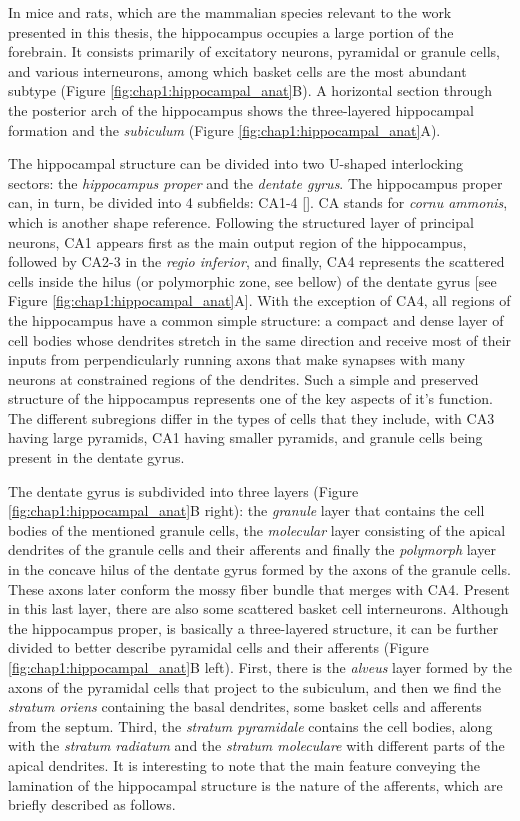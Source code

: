 In mice and rats, which are the mammalian species relevant to the work presented in this thesis, the hippocampus occupies a large portion of the forebrain. 
It consists primarily of excitatory neurons, pyramidal or granule cells, and various interneurons, among which basket cells are the most abundant subtype (Figure \ref{fig:chap1:hippocampal_anat}B). 
A horizontal section through the posterior arch of the hippocampus shows the three-layered hippocampal formation and the \textit{subiculum} (Figure \ref{fig:chap1:hippocampal_anat}A).

The hippocampal structure can be divided into two U-shaped interlocking sectors: the \textit{hippocampus proper} and the \textit{dentate gyrus}.
The hippocampus proper can, in turn, be divided into 4 subfields: CA1-4 [\cite{lorente1934}].
CA stands for \textit{cornu ammonis}, which is another shape reference. 
Following the structured layer of principal neurons, CA1 appears first as the main output region of the hippocampus, followed by CA2-3 in the \textit{regio inferior}, and finally, CA4 represents the scattered cells inside the hilus (or polymorphic zone, see bellow) of the dentate gyrus [see Figure \ref{fig:chap1:hippocampal_anat}A]. 
With the exception of CA4, all regions of the hippocampus have a common simple structure: a compact and dense layer of cell bodies whose dendrites stretch in the same direction and receive most of their inputs from perpendicularly running axons that make synapses with many neurons at constrained regions of the dendrites. 
Such a simple and preserved structure of the hippocampus represents one of the key aspects of it's function. 
The different subregions differ in the types of cells that they include, with CA3 having large pyramids, CA1 having smaller pyramids, and granule cells being present in the dentate gyrus. 

The dentate gyrus is subdivided into three layers (Figure \ref{fig:chap1:hippocampal_anat}B right): the \textit{granule} layer that contains the cell bodies of the mentioned granule cells, the \textit{molecular} layer consisting of the apical dendrites of the granule cells and their afferents and finally the \textit{polymorph} layer in the concave hilus of the dentate gyrus formed by the axons of the granule cells.
These axons later conform the mossy fiber bundle that merges with CA4. 
Present in this last layer, there are also some scattered basket cell interneurons.
Although the hippocampus proper, is basically a three-layered structure, it can be further divided to better describe pyramidal cells and their afferents (Figure \ref{fig:chap1:hippocampal_anat}B left).
First, there is the \textit{alveus} layer formed by the axons of the pyramidal cells that project to the subiculum, and then we find the \textit{stratum oriens} containing the basal dendrites, some basket cells and afferents from the septum.
Third, the \textit{stratum pyramidale} contains the cell bodies, along with the \textit{stratum radiatum} and the \textit{stratum moleculare} with different parts of the apical dendrites.
It is interesting to note that the main feature conveying the lamination of the hippocampal structure is the nature of the afferents, which are briefly described as follows.

